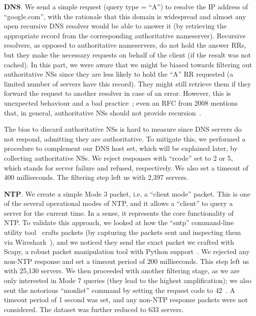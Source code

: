  \textbf{DNS}. We send a simple request (query type = ``A'') to resolve the IP address of ``google.com'', with the rationale that this domain is widespread and almost any open recursive DNS resolver would be able to answer it (by retrieving the appropriate record from the corresponding authoritative nameserver). Recursive resolvers, as opposed to authoritative nameservers, do not hold the answer RRs, but they make the necessary requests on behalf of the client (if the result was not cached). In this part, we were aware that we might be biased towards filtering out authoritative NSs since they are less likely to hold the ``A'' RR requested (a limited number of servers have this record). They might still retrieve them if they forward the request to another resolver in case of an error. However, this is unexpected behaviour and a bad practice~\cite{auth_no_rec}; even an RFC from 2008 mentions that, in general, authoritative NSs should not provide recursion~\cite{rfc-5358}. 

 The bias to discard authoritative NSs is hard to measure since DNS servers do not respond, admitting they are authoritative. To mitigate this, we performed a procedure to complement our DNS host set, which will be explained later, by collecting authoritative NSs. We reject responses with ``rcode'' set to 2 or 5, which stands for server failure and refused, respectively. We also set a timeout of 400 milliseconds. The filtering step left us with 2,397 servers.
        
 \textbf{NTP}. We create a simple Mode 3 packet, i.e. a ``client mode'' packet. This is one of the several operational modes of NTP, and it allows a ``client'' to query a server for the current time. In a sense, it represents the core functionality of NTP. To validate this approach, we looked at how the ``sntp'' command-line utility tool~\cite{sntp_overview} crafts packets (by capturing the packets sent and inspecting them via Wireshark~\cite{wireshark}), and we noticed they send the exact packet we crafted with Scapy, a robust packet manipulation tool with Python support~\cite{scapy}. We rejected any non-NTP response and set a timeout period of 200 milliseconds. This step left us with 25,130 servers. We then proceeded with another filtering stage, as we are only interested in Mode 7 queries (they lead to the highest amplification); we also sent the notorious ``monlist'' command by setting the request code to $42$~\cite{cloud_monlist}. A timeout period of 1 second was set, and any non-NTP response packets were not considered. The dataset was further reduced to 633 servers. 

